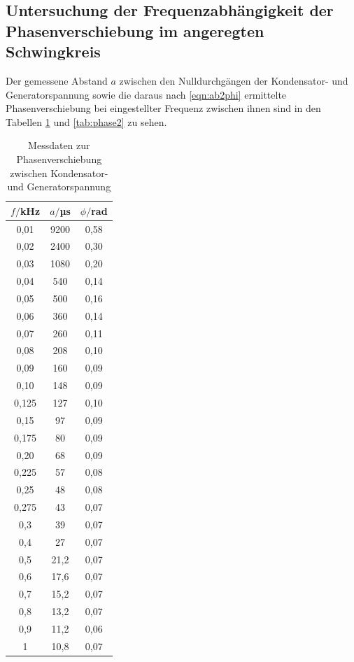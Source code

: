 \subsection{Untersuchung der Frequenzabhängigkeit der Phasenverschiebung im angeregten Schwingkreis}

Der gemessene Abstand $a$ zwischen den Nulldurchgängen der Kondensator- und Generatorspannung
sowie die daraus nach \eqref{eqn:ab2phi} ermittelte Phasenverschiebung bei eingestellter Frequenz zwischen ihnen sind
in den Tabellen \ref{tab:phase1} und \ref{tab:phase2} zu sehen.

\begin{table}
\centering
\caption{Messdaten zur Phasenverschiebung zwischen Kondensator- und Generatorspannung}
\label{tab:phase1}
\begin{tabular}{c c c}
\toprule
$f/$kHz & $a/$µs & $\phi/$rad \\
\midrule
 0,01	 & 9200    & 0,58 \\
 0,02	 & 2400    & 0,30 \\
 0,03	 & 1080    & 0,20 \\
 0,04	 &  540    & 0,14 \\
 0,05	 &  500    & 0,16 \\
 0,06	 &  360    & 0,14 \\
 0,07	 &  260    & 0,11 \\
 0,08	 &  208    & 0,10 \\
 0,09	 &  160    & 0,09 \\
 0,10	 &  148    & 0,09 \\
 0,125 &  127    & 0,10 \\
 0,15	 &   97    & 0,09 \\
 0,175 &   80    & 0,09 \\
 0,20	 &   68    & 0,09 \\
 0,225 &   57    & 0,08 \\
 0,25	 &   48    & 0,08 \\
 0,275 &   43    & 0,07 \\
 0,3	 &   39    & 0,07 \\
 0,4	 &   27    & 0,07 \\
 0,5	 &   21,2  & 0,07 \\
 0,6	 &   17,6  & 0,07 \\
 0,7	 &   15,2  & 0,07 \\
 0,8	 &   13,2  & 0,07 \\
 0,9	 &   11,2  & 0,06 \\
 1	   &   10,8  & 0,07 \\

\end{tabular}
\end{table}
